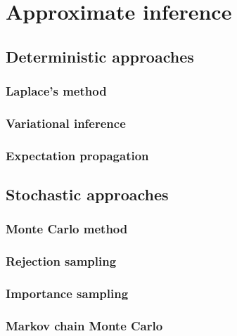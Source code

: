 \chapter{Approximate inference}\label{ch:approximate-inference}

\section{Deterministic approaches}

\subsection{Laplace's method}

\subsection{Variational inference}

\subsection{Expectation propagation}

\section{Stochastic approaches}

\subsection{Monte Carlo method}

\subsection{Rejection sampling}

\subsection{Importance sampling}

\subsection{Markov chain Monte Carlo}